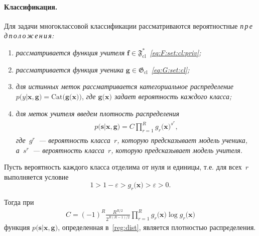 \paragraph{Классификация.} Для задачи многоклассовой классификации рассматриваются вероятностные 
{\sl{п\,р\,е\,д\,п\,о\,л\,о\,ж\,е\,н\,и\,я:}}
\begin{enumerate}[1)]
\label{st:class:1}
	\item \emph{рассматривается функция учителя} $\mathbf{f}\in\mathfrak{F}_{\text{cl}}^{*}$~\emph{\eqref{eq:F:set:cl:priv};}
	\item \emph{рассматривается функция ученика}   $\mathbf{g}\in\mathfrak{G}_{\text{cl}}$~\emph{\eqref{eq:G:set:cl};}
	\item \emph{для истинных меток рассматривается категориальное распределение}~$p\bigr(y|\mathbf{x}, \mathbf{g}\bigr) = \text{Cat}\bigr(\mathbf{g}\bigr(\mathbf{x}\bigr)\bigr)$, \emph{где $\mathbf{g}\bigr(\mathbf{x}\bigr)$ задает вероятность каждого класса;}
	\item \emph{для меток учителя введем плотность распределения}
\begin{gather}
\label{reg:dist}
\begin{aligned}
	p\bigr(\mathbf{s}|\mathbf{x}, \mathbf{g}\bigr) = C\prod_{r=1}^{R}g_r\bigr(\mathbf{x}\bigr)^{s^r},
\end{aligned}
\end{gather}
\emph{где~$g^r$~--- вероятность класса~$r$, которую предсказывает модель ученика, а~$s^r$~--- вероятность класса~$r$, которую предсказывает модель учителя.}
\end{enumerate}
\begin{theorem}
\label{theorem:st:dist}
Пусть вероятность каждого класса отделима от нуля и единицы, т.е. для всех~$r$ выполняется условие
\[1 > 1- \varepsilon > g_r\bigr(\mathbf{x}\bigr) > \varepsilon > 0.
\]

Тогда при
\begin{gather}
C=\left(-1\right)^{R}\frac{R^{R/2}}{2^{R(R-1)/2}}\prod_{r=1}^{R}g_r\bigr(\mathbf{x}\bigr)\log g_r\bigr(\mathbf{x}\bigr)
\end{gather}
функция $p\bigr(\mathbf{s}|\mathbf{x}, \mathbf{g}\bigr)$, определенная в~\eqref{reg:dist}, является плотностью распределения.
\end{theorem}
